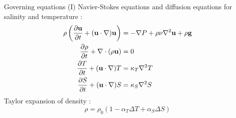 \documentclass[10pt]{beamer}
\begin{document}
\begin{frame}{Governing equations (I)}
  Navier-Stokes equations and diffusion equations for salinity and temperature :
  \begin{equation}
    \begin{aligned}
      \rho\left(\frac{\partial\mathbf{u}}{\partial t} + (\mathbf{u}\cdot\nabla)\mathbf{u}\right) & = -\nabla P + \rho\nu\nabla^2\mathbf{u} + \rho \mathbf{g} \\
      \pdv{\rho}{t} + \nabla\cdot(\rho\mathbf{u})                                                & = 0                                                       \\
      \frac{\partial T}{\partial t} + (\mathbf{u}\cdot\nabla)T                                   & = \kappa_T \nabla^2T                                      \\
      \frac{\partial S}{\partial t} + (\mathbf{u}\cdot\nabla)S                                   & = \kappa_S \nabla^2S                                      \\
    \end{aligned}
  \end{equation}
  Taylor expansion of density :
  \begin{equation}
    \rho = \rho_0(1-\alpha_T\Delta T + \alpha_S\Delta S)
  \end{equation}


\end{frame}
\end{document}
